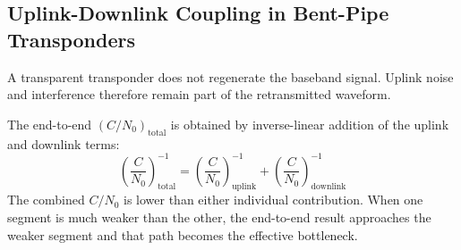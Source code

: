 \subsection{Uplink-Downlink Coupling in Bent-Pipe Transponders}
A transparent transponder does not regenerate the baseband signal. Uplink noise and interference therefore remain part of the retransmitted waveform.

The end-to-end $(C/N_0)_{\mathrm{total}}$ is obtained by inverse-linear addition of the uplink and downlink terms:
\begin{equation}
    \left( \frac{C}{N_0} \right)_{\mathrm{total}}^{-1} = \left( \frac{C}{N_0} \right)_{\mathrm{uplink}}^{-1} + \left( \frac{C}{N_0} \right)_{\mathrm{downlink}}^{-1}
\end{equation}
The combined $C/N_0$ is lower than either individual contribution. When one segment is much weaker than the other, the end-to-end result approaches the weaker segment and that path becomes the effective bottleneck.
